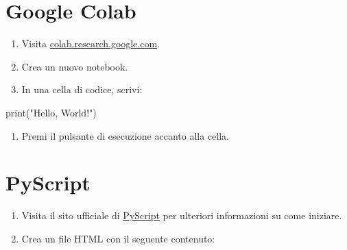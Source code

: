 \documentclass[
  letterpaper,
  DIV=11,
  numbers=noendperiod]{scrreprt}
\newenvironment{Shaded}{\begin{snugshade}}{\end{snugshade}}
\newcommand{\BuiltInTok}[1]{\textcolor[rgb]{0.00,0.23,0.31}{#1}}
\newcommand{\NormalTok}[1]{\textcolor[rgb]{0.00,0.23,0.31}{#1}}
\newcommand{\StringTok}[1]{\textcolor[rgb]{0.13,0.47,0.30}{#1}}
\providecommand{\tightlist}{%
  \setlength{\itemsep}{0pt}\setlength{\parskip}{0pt}}\usepackage{longtable,booktabs,array}
\begin{document}
\section{Google Colab}

\begin{enumerate}
\def\labelenumi{\arabic{enumi}.}
\tightlist
\item
  Visita
  \href{https://colab.research.google.com/}{colab.research.google.com}.
\item
  Crea un nuovo notebook.
\item
  In una cella di codice, scrivi:
\end{enumerate}

\begin{Shaded}
\begin{Highlighting}[]
\BuiltInTok{print}\NormalTok{(}\StringTok{"Hello, World!"}\NormalTok{)}
\end{Highlighting}
\end{Shaded}

\begin{enumerate}
\def\labelenumi{\arabic{enumi}.}
\setcounter{enumi}{3}
\tightlist
\item
  Premi il pulsante di esecuzione accanto alla cella.
\end{enumerate}

\section{PyScript}

\begin{enumerate}
\def\labelenumi{\arabic{enumi}.}
\tightlist
\item
  Visita il sito ufficiale di \href{https://pyscript.net/}{PyScript} per
  ulteriori informazioni su come iniziare.
\item
  Crea un file HTML con il seguente contenuto:
\end{enumerate}
\end{document}
